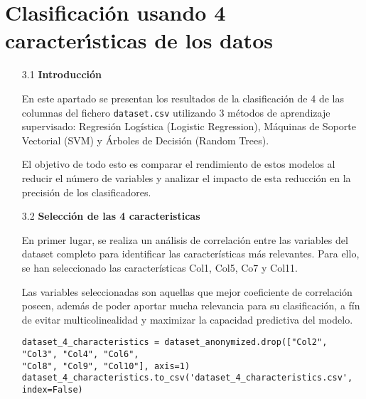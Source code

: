 \documentclass{article}
\begin{document}
\newpage

\section[3]{Clasificaci\'on usando 4 caracter\'{\i}sticas de los datos}

\bigskip

\begin{itemize}

\item[3.1]  {\bf Introducci\'on}

En este apartado se presentan los resultados de la clasificaci\'on de 4 de las columnas del fichero \texttt{dataset.csv} utilizando 3 m\'etodos de aprendizaje supervisado: Regresi\'on Log\'istica (Logistic Regression), M\'aquinas de Soporte Vectorial (SVM) y \'Arboles de Decisi\'on (Random Trees).

El objetivo de todo esto es comparar el rendimiento de estos modelos al reducir el n\'umero de variables y analizar el impacto de esta reducci\'on en la precisi\'on de los clasificadores.

\end{itemize}

\bigskip

\begin{itemize}

\item[3.2]  {\bf Selecci\'on de las 4 caracteristicas}

En primer lugar, se realiza un an\'alisis de correlaci\'on entre las variables del dataset completo para identificar las caracter\'isticas m\'as relevantes. Para ello, se han seleccionado las caracter\'isticas Col1, Col5, Co7 y Col11.

Las variables seleccionadas son aquellas que mejor coeficiente de correlaci\'on poseen, adem\'as de poder aportar mucha relevancia para su clasificaci\'on, a f\'in de evitar multicolinealidad y maximizar la capacidad predictiva del modelo.

\begin{tcolorbox}[width=14cm]
\begin{scriptsize}
\begin{verbatim}
dataset_4_characteristics = dataset_anonymized.drop(["Col2", "Col3", "Col4", "Col6",
"Col8", "Col9", "Col10"], axis=1)
dataset_4_characteristics.to_csv('dataset_4_characteristics.csv', index=False)
\end{verbatim}
\end{scriptsize}
\end{tcolorbox}

\end{itemize}
\end{document}
